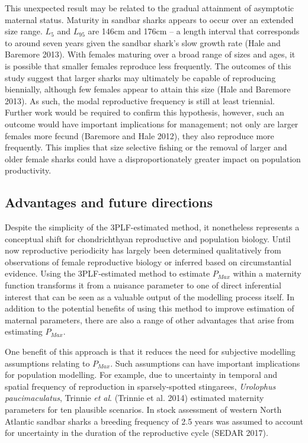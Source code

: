 \documentclass[
]{article}
\begin{document}
This unexpected result may be related to the gradual attainment of asymptotic maternal status. Maturity in sandbar sharks appears to occur over an extended size range. \(L_{5}\) and \(L_{95}\) are 146cm and 176cm -- a length interval that corresponds to around seven years given the sandbar shark's slow growth rate (Hale and Baremore 2013). With females maturing over a broad range of sizes and ages, it is possible that smaller females reproduce less frequently. The outcomes of this study suggest that larger sharks may ultimately be capable of reproducing biennially, although few females appear to attain this size (Hale and Baremore 2013). As such, the modal reproductive frequency is still at least triennial. Further work would be required to confirm this hypothesis, however, such an outcome would have important implications for management; not only are larger females more fecund (Baremore and Hale 2012), they also reproduce more frequently. This implies that size selective fishing or the removal of larger and older female sharks could have a disproportionately greater impact on population productivity.

\subsection{Advantages and future directions}\label{advantages-and-future-directions}

Despite the simplicity of the 3PLF-estimated method, it nonetheless represents a conceptual shift for chondrichthyan reproductive and population biology. Until now reproductive periodicity has largely been determined qualitatively from observations of female reproductive biology or inferred based on circumstantial evidence. Using the 3PLF-estimated method to estimate \(P_{Max}\) within a maternity function transforms it from a nuisance parameter to one of direct inferential interest that can be seen as a valuable output of the modelling process itself. In addition to the potential benefits of using this method to improve estimation of maternal parameters, there are also a range of other advantages that arise from estimating \(P_{Max}\).

One benefit of this approach is that it reduces the need for subjective modelling assumptions relating to \(P_{Max}\). Such assumptions can have important implications for population modelling. For example, due to uncertainty in temporal and spatial frequency of reproduction in sparsely-spotted stingarees, \emph{Urolophus paucimaculatus}, Trinnie \emph{et al}. (Trinnie et al. 2014) estimated maternity parameters for ten plausible scenarios. In stock assessment of western North Atlantic sandbar sharks a breeding frequency of 2.5 years was assumed to account for uncertainty in the duration of the reproductive cycle (SEDAR 2017).
\end{document}
